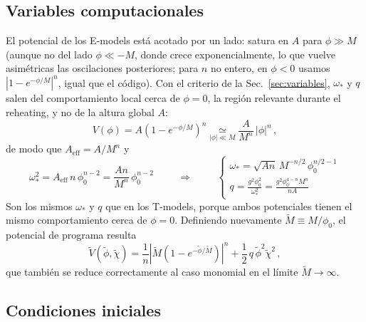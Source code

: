         \subsection{Variables computacionales}

            El potencial de los E-models está acotado por un lado: satura en $A$ para $\phi \gg M$ (aunque no del lado $\phi \ll -M$, donde crece exponencialmente, lo que vuelve asimétricas las oscilaciones posteriores; para $n$ no entero, en $\phi<0$ usamos $|1 - e^{-\phi/M}|^n$, igual que el código). Con el criterio de la Sec.~\ref{sec:variables}, $\omega_*$ y $q$ salen del comportamiento local cerca de $\phi = 0$, la región relevante durante el reheating, y no de la altura global $A$:
            \begin{equation}
                V(\phi) = A \left( 1 - e^{-\phi/M} \right)^n \underset{|\phi| \ll M}{\simeq} \frac{A}{M^n} \, |\phi|^n \, ,
            \end{equation}
            de modo que $A_{\text{eff}} = A/M^n$ y
            \begin{equation}
                \omega_*^2 = A_{\text{eff}} \, n \, \phi_0^{n-2} = \frac{A n}{M^n} \, \phi_0^{n-2}
                \hspace{1cm} \Longrightarrow \hspace{1cm}
                \begin{cases}
                    \omega_* = \sqrt{A n} \, M^{-n/2} \, \phi_0^{n/2 - 1} \\
                    \displaystyle q = \frac{g^2 \phi_0^2}{\omega_*^2} = \frac{g^2 \phi_0^{4-n} M^n}{n A}
                \end{cases}
            \end{equation}
            Son los mismos $\omega_*$ y $q$ que en los T-models, porque ambos potenciales tienen el mismo comportamiento cerca de $\phi = 0$. Definiendo nuevamente $\tilde{M} \equiv M/\phi_0$, el potencial de programa resulta
            \begin{equation}
                \tilde{V} \left( \tilde{\phi}, \tilde{\chi} \right) = \frac{1}{n} \left| \tilde{M} \left( 1 - e^{-\tilde{\phi}/\tilde{M}} \right) \right|^n + \frac{1}{2} \, q \, \tilde{\phi}^2 \tilde{\chi}^2 \, ,
            \end{equation}
            que también se reduce correctamente al caso monomial en el límite $\tilde M \to \infty$.

        \subsection{Condiciones iniciales}


